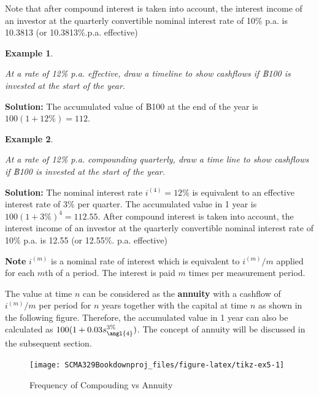 \documentclass[
]{book}
\theoremstyle{definition}
\theoremstyle{definition}
\newtheorem{example}{Example}[chapter]
\theoremstyle{definition}
\theoremstyle{definition}
\theoremstyle{remark}
\begin{document}
Note that after compound interest is
taken into account, the interest income of an investor at the quarterly
convertible nominal interest rate of 10\% p.a. is 10.3813 (or 10.3813\%.p.a. effective)

\begin{example}
\protect\hypertarget{exm:unlabeled-div-6}{}\label{exm:unlabeled-div-6}

\emph{At a rate of 12\% p.a. effective, draw a timeline to show cashflows if
฿100 is invested at the start of the year.}

\end{example}

\textbf{Solution:} The accumulated value of ฿100 at the end of the year is
\(100 (1 + 12\%) = 112\).

\begin{example}
\protect\hypertarget{exm:unlabeled-div-7}{}\label{exm:unlabeled-div-7}

\emph{At a rate of 12\% p.a. compounding quarterly, draw a time line to show
cashflows if ฿100 is invested at the start of the year.}

\end{example}

\textbf{Solution:} The nominal interest rate \(i^{(4)} = 12\%\) is equivalent
to an effective interest rate of \(3\%\) per quarter. The accumulated
value in 1 year is \(100 (1 + 3\%)^4 = 112.55\). After compound interest
is taken into account, the interest income of an investor at the
quarterly convertible nominal interest rate of 10\% p.a. is 12.55 (or
12.55\%. p.a. effective)

\textbf{Note} \(i^{(m)}\) is a nominal rate of interest which is equivalent to \(i^{(m)}/m\) applied for
each \(m\)th of a period. The interest is paid \(m\) times per measurement period.

The value at time \(n\) can be considered as the \textbf{annuity} with a cashflow of \(i^{(m)}/m\) per period for \(n\) years together with the capital at time \(n\) as shown in the following figure.
Therefore, the accumulated value in 1 year can also be calculated as \(100( 1 + 0.03 s_{\angl{4}}^{3\%})\). The concept of annuity will be discussed in the subsequent section.

\begin{figure}

{\centering \texttt{[image: SCMA329Bookdownproj\_files/figure-latex/tikz-ex5-1]} 

}

\caption{Frequency of Compouding vs Annuity}\label{fig:tikz-ex5}
\end{figure}
\end{document}

